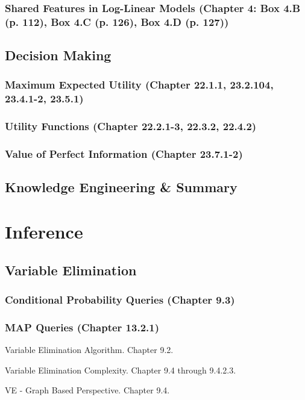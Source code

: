 \documentclass[12pt]{article}
\numberwithin{equation}{section}
\begin{document}
\subsubsection{Shared Features in Log-Linear Models (Chapter 4: Box 4.B (p. 112), Box 4.C (p. 126), Box 4.D (p. 127))}

\subsection{Decision Making}
\subsubsection{Maximum Expected Utility (Chapter 22.1.1, 23.2.104, 23.4.1-2, 23.5.1)}
\subsubsection{Utility Functions (Chapter 22.2.1-3, 22.3.2, 22.4.2)}
\subsubsection{Value of Perfect Information (Chapter 23.7.1-2)}

\subsection{Knowledge Engineering \& Summary}


\section{Inference}
\subsection{Variable Elimination}
\subsubsection{Conditional Probability Queries (Chapter 9.3)}

\subsubsection{MAP Queries (Chapter 13.2.1)}

Variable Elimination Algorithm. Chapter 9.2.

Variable Elimination Complexity. Chapter 9.4 through 9.4.2.3.

VE - Graph Based Perspective. Chapter 9.4.
\end{document}
